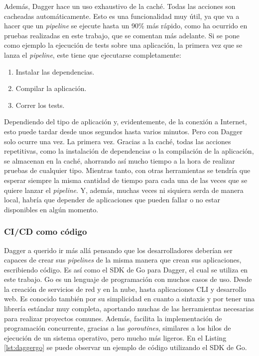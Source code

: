 Además, Dagger hace un uso exhaustivo de la caché. Todas las acciones son cacheadas automáticamente. Esto es una funcionalidad muy útil, ya que va a hacer que un \textit{pipeline} se ejecute hasta un 90\% más rápido, como ha ocurrido en pruebas realizadas en este trabajo, que se comentan más adelante. Si se pone como ejemplo la ejecución de tests sobre una aplicación, la primera vez que se lanza el \textit{pipeline}, este tiene que ejecutarse completamente:

\begin{enumerate}
  \item Instalar las dependencias.
  \item Compilar la aplicación.
  \item Correr los tests.
\end{enumerate}

Dependiendo del tipo de aplicación y, evidentemente, de la conexión a Internet, esto puede tardar desde unos segundos hasta varios minutos. Pero con Dagger solo ocurre una vez. La primera vez. Gracias a la caché, todas las acciones repetitivas, como la instalación de dependencias o la compilación de la aplicación, se almacenan en la caché, ahorrando así mucho tiempo a la hora de realizar pruebas de cualquier tipo. Mientras tanto, con otras herramientas se tendría que esperar siempre la misma cantidad de tiempo para cada una de las veces que se quiere lanzar el \textit{pipeline}. Y, además, muchas veces ni siquiera serda de manera local, habría que depender de aplicaciones que pueden fallar o no estar disponibles en algún momento.

\subsubsection*{CI/CD como código}

Dagger a querido ir más allá pensando que los desarrolladores deberían ser capaces de crear sus \textit{pipelines} de la misma manera que crean sus aplicaciones, escribiendo código. Es así como el SDK de Go\cite{go} para Dagger, el cual se utiliza en este trabajo. Go es un lenguaje de programación con muchos casos de uso. Desde la creación de servicios de red y en la nube, hasta aplicaciones CLI y desarrollo web. Es conocido también por su simplicidad en cuanto a sintaxis y por tener una librería estándar muy completa, aportando muchas de las herramientas necesarias para realizar proyectos comunes. Además, facilita la implementación de programación concurrente, gracias a las \textit{goroutines}, similares a los hilos de ejecución de un sistema operativo, pero mucho más ligeros. En el Listing \ref{lst:daggergo} se puede observar un ejemplo de código\cite{daggergo} utilizando el SDK de Go.

